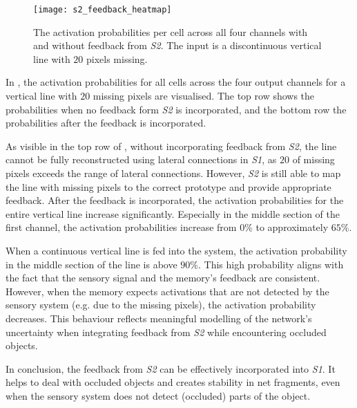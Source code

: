 \begin{figure}[h]
    \centering
    \texttt{[image: s2\_feedback\_heatmap]}
    \caption[Activation probabilities with and without \emph{S2} feedback]{The activation probabilities per cell across all four channels with and without feedback from \emph{S2}. The input is a discontinuous vertical line with $20$ pixels missing.}
\end{figure}
%
In , the activation probabilities for all cells across the four output channels for a vertical line with $20$ missing pixels are visualised.
The top row shows the probabilities when no feedback form \emph{S2} is incorporated, and the bottom row the probabilities after the feedback is incorporated.

As visible in the top row of , without incorporating feedback from \emph{S2}, the line cannot be fully reconstructed using lateral connections in \emph{S1}, as $20$ of missing pixels exceeds the range of lateral connections. However, \emph{S2} is still able to map the line with missing pixels to the correct prototype and provide appropriate feedback. After the feedback is incorporated, the activation probabilities for the entire vertical line increase significantly. Especially in the middle section of the first channel, the activation probabilities increase from $0\%$ to approximately $65\%$.

When a continuous vertical line is fed into the system, the activation probability in the middle section of the line is above $90\%$.
This high probability aligns with the fact that the sensory signal and the memory's feedback are consistent.
However, when the memory expects activations that are not detected by the sensory system (e.g. due to the missing pixels), the activation probability decreases. This behaviour reflects meaningful modelling of the network's uncertainty when integrating feedback from \emph{S2} while encountering occluded objects.

In conclusion, the feedback from \emph{S2} can be effectively incorporated into \emph{S1}.
It helps to deal with occluded objects and creates stability in net fragments, even when the sensory system does not detect (occluded) parts of the object.



